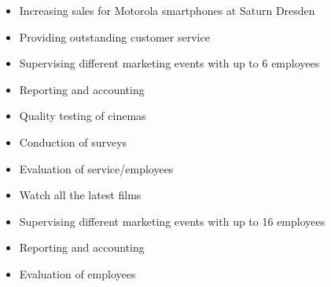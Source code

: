 \documentclass[10pt,a4paper]{altacv}
\begin{document}

\begin{itemize}
\item Increasing sales for Motorola smartphones at Saturn Dresden 
\item Providing outstanding customer service \faThumbsOUp
\end{itemize}

\divider
{}
\begin{itemize}
\item Supervising different marketing events with up to 6 employees
\item Reporting and accounting
\end{itemize}

\divider
{}
\begin{itemize}
\item Quality testing of cinemas
\item Conduction of surveys
\item Evaluation of service/employees
\item Watch all the latest films  \faFilm
\end{itemize}

\divider
{}
\begin{itemize}
\item Supervising different marketing events with up to 16 employees
\item Reporting and accounting
\item Evaluation of employees
\end{itemize}



\clearpage







\end{document}
